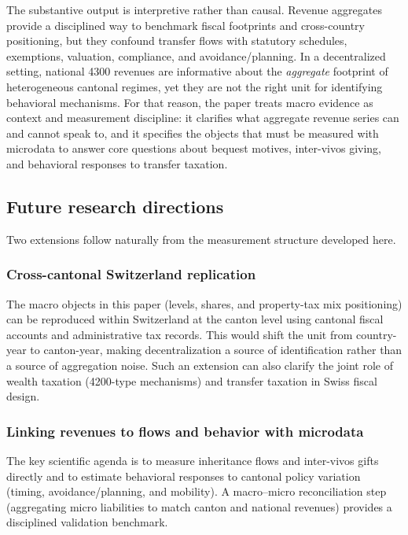 \documentclass[11pt,a4paper]{article}
\begin{document}
The substantive output is interpretive rather than causal. Revenue aggregates provide a disciplined way to benchmark fiscal footprints and cross-country positioning, but they confound transfer flows with statutory schedules, exemptions, valuation, compliance, and avoidance/planning. In a decentralized setting, national 4300 revenues are informative about the \emph{aggregate} footprint of heterogeneous cantonal regimes, yet they are not the right unit for identifying behavioral mechanisms. For that reason, the paper treats macro evidence as context and measurement discipline: it clarifies what aggregate revenue series can and cannot speak to, and it specifies the objects that must be measured with microdata to answer core questions about bequest motives, inter-vivos giving, and behavioral responses to transfer taxation.

\subsection{Future research directions}
Two extensions follow naturally from the measurement structure developed here.

\subsubsection{Cross-cantonal Switzerland replication}
The macro objects in this paper (levels, shares, and property-tax mix positioning) can be reproduced within Switzerland at the canton level using cantonal fiscal accounts and administrative tax records. This would shift the unit from country-year to canton-year, making decentralization a source of identification rather than a source of aggregation noise. Such an extension can also clarify the joint role of wealth taxation (4200-type mechanisms) and transfer taxation in Swiss fiscal design.

\subsubsection{Linking revenues to flows and behavior with microdata}
The key scientific agenda is to measure inheritance flows and inter-vivos gifts directly and to estimate behavioral responses to cantonal policy variation (timing, avoidance/planning, and mobility). A macro--micro reconciliation step (aggregating micro liabilities to match canton and national revenues) provides a disciplined validation benchmark.


\newpage
\printbibliography
\end{document}
